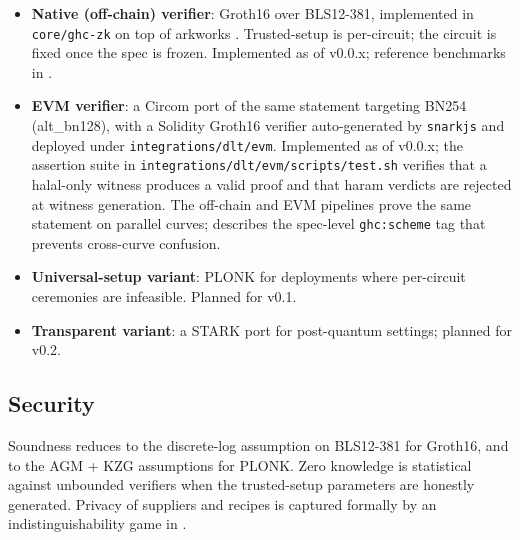 \begin{itemize}
  \item \textbf{Native (off-chain) verifier}: Groth16
        \cite{groth16} over BLS12-381, implemented in
        \texttt{core/ghc-zk} on top of arkworks
        \cite{arkworks}. Trusted-setup is per-circuit; the
        circuit is fixed once the spec is frozen. Implemented as of
        v0.0.x; reference benchmarks in .
  \item \textbf{EVM verifier}: a Circom \cite{circom} port of the
        same statement targeting BN254 (alt\_bn128), with a Solidity
        Groth16 verifier auto-generated by \texttt{snarkjs} and
        deployed under \texttt{integrations/dlt/evm}. Implemented as
        of v0.0.x; the assertion suite in
        \texttt{integrations/dlt/evm/scripts/test.sh} verifies that
        a halal-only witness produces a valid proof and that haram
        verdicts are rejected at witness generation. The off-chain
        and EVM pipelines prove the same statement on parallel
        curves;  describes the spec-level
        \texttt{ghc:scheme} tag that prevents cross-curve confusion.
  \item \textbf{Universal-setup variant}: PLONK \cite{plonk} for
        deployments where per-circuit ceremonies are infeasible.
        Planned for v0.1.
  \item \textbf{Transparent variant}: a STARK port for
        post-quantum settings; planned for v0.2.
\end{itemize}

\subsection{Security}

Soundness reduces to the discrete-log assumption on BLS12-381 for
Groth16, and to the AGM + KZG \cite{kzg} assumptions for PLONK. Zero
knowledge is statistical against unbounded verifiers when the
trusted-setup parameters are honestly generated. Privacy of suppliers
and recipes is captured formally by an indistinguishability game in
.
